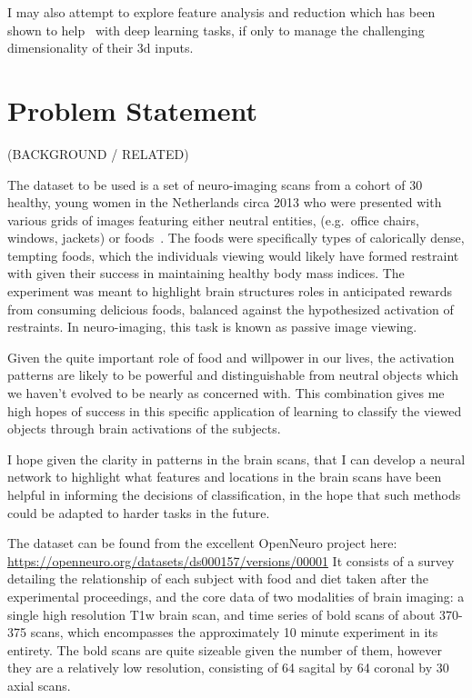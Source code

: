 \documentclass[10pt,twocolumn,letterpaper]{article}
\begin{document}
I may also attempt to explore feature analysis and reduction which has been shown to
help~\cite{shi2018feature} with deep learning tasks, if only to manage the challenging
dimensionality of their 3d inputs.



\section{Problem Statement}\label{sec:problem-statement}

(BACKGROUND / RELATED)

The dataset to be used is a set of neuro-imaging scans from a cohort of 30 healthy, young women in the
Netherlands circa 2013 who were presented with various grids of images featuring
either neutral entities, (e.g.\ office chairs, windows, jackets) or foods~\cite{smeets2013allured}.
The foods were specifically types of calorically dense, tempting foods, which the individuals viewing would likely
have formed restraint with given their success in maintaining healthy body mass indices.
The experiment was meant to highlight brain structures roles in anticipated rewards from consuming delicious foods,
balanced against the hypothesized activation of restraints.
In neuro-imaging, this task is known as passive image viewing.

Given the quite important role of food and willpower in our lives, the activation patterns are likely to be powerful
and distinguishable from neutral objects which we haven't evolved to be nearly as concerned with.
This combination gives me high hopes of success in this specific application of learning to classify the viewed
objects through brain activations of the subjects.

I hope given the clarity in patterns in the brain scans, that I can develop a neural network to highlight what
features and locations in the brain scans have been helpful in informing the decisions of classification, in the
hope that such methods could be adapted to harder tasks in the future.

The dataset can be found from the excellent
OpenNeuro project here: \url{https://openneuro.org/datasets/ds000157/versions/00001}
It consists of a survey detailing the relationship of each subject with food and diet taken after the experimental
proceedings, and the core data of two modalities of brain imaging: a single high resolution T1w brain scan,
and time series of bold scans of about 370-375 scans, which encompasses the approximately 10 minute experiment
in its entirety.
The bold scans are quite sizeable given the number of them, however they are a relatively low resolution, consisting
of 64 sagital by 64 coronal by 30 axial scans.
\end{document}
